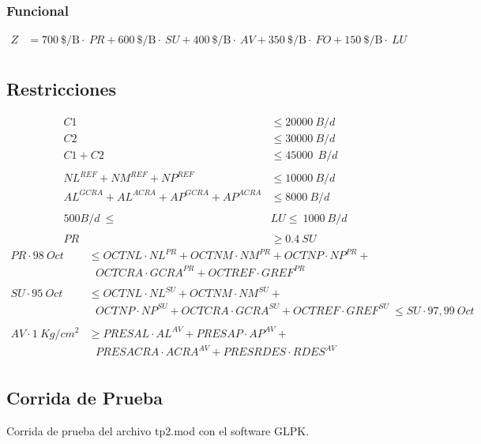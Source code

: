 \documentclass[a4paper,10pt]{article}
\begin{document}
\subsubsection{Funcional}

\begin{align*}
 Z &= 700 \ \text{\$/B} \cdot \ PR + 600\ \text{\$/B} \cdot \ SU + 400\ \text{\$/B} \cdot \ AV + 350\ \text{\$/B} \cdot \ FO + 150\ \text{\$/B} \cdot \ LU \\
\end{align*}

\subsection{Restricciones}

\begin{align*}
 C1 &\leq 20000 \ B/d \\
 C2 &\leq 30000 \ B/d \\
 C1 + C2 &\leq 45000 \ \ B/d \\
 \\
 NL^{REF} + NM^{REF} + NP^{REF} &\leq 10000 \ B/d \\
 AL^{GCRA} + AL^{ACRA} +  AP^{GCRA} + AP^{ACRA} &\leq 8000 \ B/d \\
 \\
  500 B/d \ \leq\ &LU \leq \ 1000 \ B/d \\
 \\
PR &\geq 0.4 \ SU 
 \end{align*}
 \begin{align*}
PR \cdot 98 \ Oct \ &\leq OCTNL \cdot NL^{PR} + OCTNM \cdot NM^{PR} + OCTNP \cdot NP^{PR} +  \\
			& \ \ \ OCTCRA \cdot GCRA^{PR} + OCTREF \cdot GREF^{PR}\\
\\
SU \cdot 95 \ Oct \ &\leq OCTNL \cdot NL^{SU} + OCTNM \cdot NM^{SU} + \\
& \ \ \ OCTNP \cdot NP^{SU} + OCTCRA \cdot GCRA^{SU} + OCTREF \cdot GREF^{SU} \ \leq SU \cdot 97,99 \ Oct  \\
\\
AV \cdot 1 \ Kg/cm^{2} &\geq PRESAL \cdot AL^{AV} + PRESAP \cdot AP^{AV} + \\
				& \ \ \ PRESACRA \cdot ACRA^{AV} + PRESRDES \cdot RDES^{AV}\\
\end{align*}
\newpage
{}
\subsection{Corrida de Prueba}
Corrida de prueba del archivo tp2.mod con el software GLPK.\\
\end{document}
